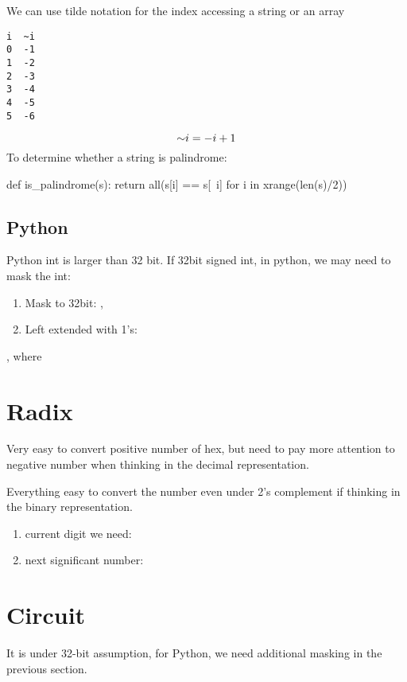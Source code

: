  We can use tilde notation for the index accessing a string or an array
\begin{lstlisting}
i  ~i  
0  -1
1  -2
2  -3
3  -4 
4  -5 
5  -6
\end{lstlisting}
$$
\mathord{\sim} i = -i+1
$$
To determine whether a string is palindrome:
\begin{python}
def is_palindrome(s):
  return all(s[i] == s[~i] for i in xrange(len(s)/2)) 
\end{python}

\subsection{Python}
Python int is larger than 32 bit. 
If 32bit signed int, in python, we may need to mask the int:
\begin{enumerate}
\item Mask to 32bit: , 
\item Left extended with 1's: 
\end{enumerate}

, where 

\section{Radix}
 Very easy to convert positive number of hex, but need to pay more attention to negative number when thinking in the decimal representation. 

Everything easy to convert the number even under 2's complement if thinking in the binary representation. 
\begin{enumerate}
\item current digit we need: 
\item next significant number: 
\end{enumerate}
\section{Circuit}
It is under 32-bit assumption, for Python, we need additional masking in the previous section. 
